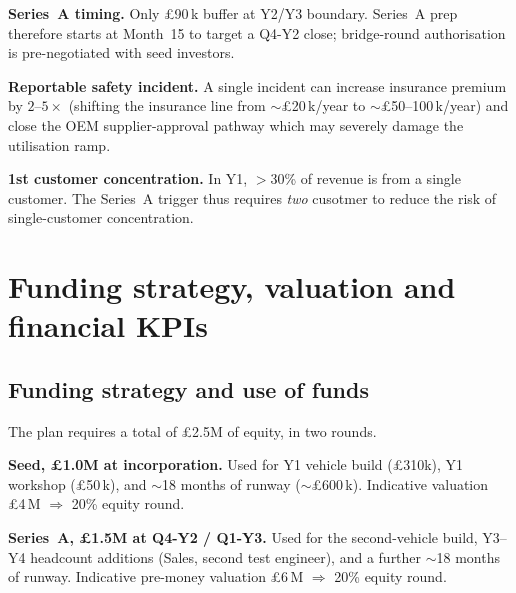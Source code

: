 \documentclass[11pt, a4paper]{report}
\numberwithin{equation}{section}
\newcommand{\seedRound}{\pounds1.0M\xspace}
\newcommand{\seriesARound}{\pounds1.5M\xspace}
\newcommand{\totalRaise}{\pounds2.5M\xspace}
\newcommand{\capexPerVehicle}{\pounds310k\xspace}
\begin{document}
\begin{refsection}
\begin{tightitemize}
  \item \textbf{Series~A timing.} Only \pounds90\,k buffer at
        Y2/Y3 boundary. Series~A prep therefore starts at Month~15
        to target a Q4-Y2 close; bridge-round authorisation is
        pre-negotiated with seed investors.
  \item \textbf{Reportable safety incident.} A single incident can
        increase insurance premium by $2$--$5\times$ (shifting the
        insurance line from $\sim$\pounds20\,k/year to
        $\sim$\pounds50--100\,k/year) and close the OEM
        supplier-approval pathway which may severely damage the utilisation ramp.
  \item \textbf{1st customer concentration.} In Y1,
        $>$30\% of revenue is from a single customer. The Series~A trigger thus requires \emph{two} cusotmer to reduce the risk of
        single-customer concentration.
\end{tightitemize}

\section{Funding strategy, valuation and financial KPIs}
\label{ch:funding}

\subsection{Funding strategy and use of funds}
\label{sec:funding}

The plan requires a total of \totalRaise of equity, in two
rounds.

\begin{tightitemize}
  \item \textbf{Seed, \seedRound at incorporation.} Used for Y1
        vehicle build (\capexPerVehicle), Y1 workshop (\pounds50\,k), and $\sim$18 months of runway
        ($\sim$\pounds600\,k). Indicative valuation
        \pounds4\,M $\Rightarrow$ 20\% equity round.
  \item \textbf{Series~A, \seriesARound at Q4-Y2 / Q1-Y3.} Used
        for the second-vehicle build, Y3--Y4 headcount additions
        (Sales, second test engineer), and a further $\sim$18
        months of runway. Indicative pre-money valuation
        \pounds6\,M $\Rightarrow$ 20\% equity round.
\end{tightitemize}


\end{refsection}
\end{document}
